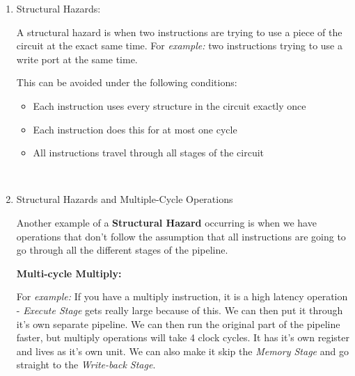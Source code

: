 \documentclass[12pt]{article}
\newenvironment{QandA}{\begin{enumerate}[label=\bfseries\arabic*.]\bfseries}
                      {\end{enumerate}}
\newenvironment{answered}{\par\quad\normalfont}{}
\begin{document}
\begin{QandA}
\begin{answered}
    Once this condition is detected as above, a stall or bubble can be inserted. In the following cycle, a regular \textbf{WX Bypass} can be used.
    
    \textit{Performance:} Assuming that 50\% of loads are followed by dependent instructions (load-to-use), then this will require 1 stall cycle (an insertion of a no-op).
    
    The resulting performance will then be CPI = 1 + (1 $\times$ 0.20 $\times$ 0.50).
    
    We can also include additional optimization by re-arranging instructions as seen with \textit{software interlocks}, but this time we do it for performance and not for correctness. 
    \end{answered}
    
    \ 

    \item Structural Hazards:
    \begin{answered}
        A structural hazard is when two instructions are trying to use a piece of the circuit at the exact same time. For \textit{example:} two instructions trying to use a write port at the same time. 
        
        This can be avoided under the following conditions:
        \begin{itemize}
            \item Each instruction uses every structure in the circuit exactly once
            \item Each instruction does this for at most one cycle
            \item All instructions travel through all stages of the circuit
        \end{itemize}
    \end{answered}
    
    \ 
    
    \item Structural Hazards and Multiple-Cycle Operations
    \begin{answered}
    Another example of a \textbf{Structural Hazard} occurring is when we have operations that don't follow the assumption that all instructions are going to go through all the different stages of the pipeline. 
    
    \textbf{Multi-cycle Multiply:}
    
    For \textit{example:} If you have a multiply instruction, it is a high latency operation - \textit{Execute Stage} gets really large because of this. We can then put it through it's own separate pipeline. We can then run the original part of the pipeline faster, but multiply operations will take 4 clock cycles. It has it's own register and lives as it's own unit. We can also make it skip the \textit{Memory Stage} and go straight to the \textit{Write-back Stage}.
    

\end{answered}
\end{QandA}
\end{document}
